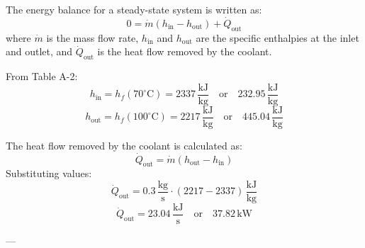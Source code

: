The energy balance for a steady-state system is written as:  
\[
0 = \dot{m} (h_{\text{in}} - h_{\text{out}}) + \dot{Q}_{\text{out}}
\]  
where \( \dot{m} \) is the mass flow rate, \( h_{\text{in}} \) and \( h_{\text{out}} \) are the specific enthalpies at the inlet and outlet, and \( \dot{Q}_{\text{out}} \) is the heat flow removed by the coolant.  

From Table A-2:  
\[
h_{\text{in}} = h_f(70^\circ\text{C}) = 2337 \, \frac{\text{kJ}}{\text{kg}} \quad \text{or} \quad 232.95 \, \frac{\text{kJ}}{\text{kg}}
\]  
\[
h_{\text{out}} = h_f(100^\circ\text{C}) = 2217 \, \frac{\text{kJ}}{\text{kg}} \quad \text{or} \quad 445.04 \, \frac{\text{kJ}}{\text{kg}}
\]  

The heat flow removed by the coolant is calculated as:  
\[
\dot{Q}_{\text{out}} = \dot{m} (h_{\text{out}} - h_{\text{in}})
\]  
Substituting values:  
\[
\dot{Q}_{\text{out}} = 0.3 \, \frac{\text{kg}}{\text{s}} \cdot (2217 - 2337) \, \frac{\text{kJ}}{\text{kg}}
\]  
\[
\dot{Q}_{\text{out}} = 23.04 \, \frac{\text{kJ}}{\text{s}} \quad \text{or} \quad 37.82 \, \text{kW}
\]  

---